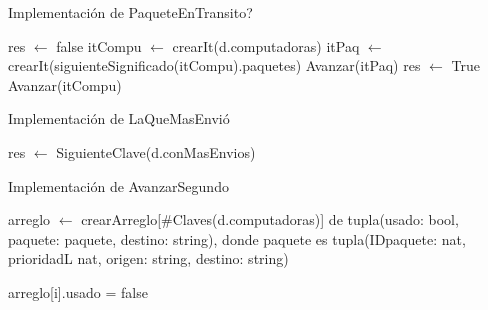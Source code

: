 \begin{Algoritmos}

\begin{algorithm}
\caption{Implementaci\'on de PaqueteEnTransito?}
\begin{algorithmic}[0]
	\State res $\gets$ false 
	\State itCompu $\gets$ crearIt(d.computadoras) 
		\newline  {}
		\State itPaq $\gets$ crearIt(siguienteSignificado(itCompu).paquetes) 
			\State Avanzar(itPaq)  
		\EndWhile
		 
			\State res $\gets$ True 
		\EndIf
		\State Avanzar(itCompu) 
	\EndWhile
\EndFunction
\end{algorithmic}
\end{algorithm}

\begin{algorithm}
\caption{Implementaci\'on de LaQueMasEnvi\'o}
\begin{algorithmic}[0]
	\State res $\gets$ SiguienteClave(d.conMasEnvios)	
\EndFunction
\end{algorithmic}
\end{algorithm}

\begin{algorithm}
\caption{Implementaci\'on de AvanzarSegundo}
\begin{algorithmic}[0]


	\State arreglo $\gets$ crearArreglo[$\#$Claves(d.computadoras)] de tupla(usado: bool, paquete: paquete, destino: string), donde paquete es tupla(IDpaquete: nat, prioridadL nat, origen: string, destino: string)
	\State {}
	
	 
	\State arreglo[i].usado = false 
	\EndFor
	
	

\end{algorithmic}
\end{algorithm}
\end{Algoritmos}
